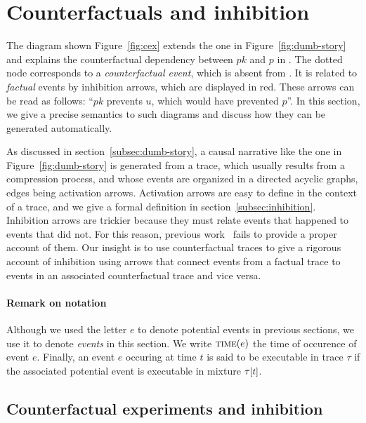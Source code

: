 
\section{Counterfactuals and inhibition}\label{sec:inhibition}

The diagram shown Figure~\ref{fig:cex} extends the one in
Figure~\ref{fig:dumb-story} and explains the counterfactual dependency
between $pk$ and $p$ in \RefTrace{}. The dotted node corresponds to a
\emph{counterfactual event}, which is absent from \RefTrace{}. It is
related to \emph{factual} events by inhibition arrows, which are
displayed in red. These arrows can be read as follows: ``$pk$ prevents
$u$, which would have prevented $p$''.  In this section, we give a
precise semantics to such diagrams and discuss how they can be
generated automatically.

As discussed in section~\ref{subsec:dumb-story}, a causal narrative
like the one in Figure~\ref{fig:dumb-story} is generated from a trace,
which usually results from a compression process, and whose events are
organized in a directed acyclic graphs, edges being activation arrows.
Activation arrows are easy to define in the context of a trace, and we
give a formal definition in section~\ref{subsec:inhibition}.
Inhibition arrows are trickier because they must relate events that
happened to events that did not. For this reason, previous
work~\cite{DanosEtAl-CONCUR07} fails to provide a proper account of
them.  Our insight is to use counterfactual traces to give a rigorous
account of inhibition using arrows that connect events from a factual
trace to events in an associated counterfactual trace and vice versa.


\paragraph{Remark on notation} Although we used the letter $e$ to
denote potential events in previous sections, we use it to denote
\emph{events} in this section. We write $\textsc{time}(e)$ the time
of occurence of event $e$. Finally, an event $e$ occuring at time $t$
is said to be executable in trace $\tau$ if the associated potential
event is executable in mixture $\TSTATE{t}{\tau}$.


\subsection{Counterfactual experiments and inhibition}
\label{subsec:cex}\label{subsec:inhibition}

